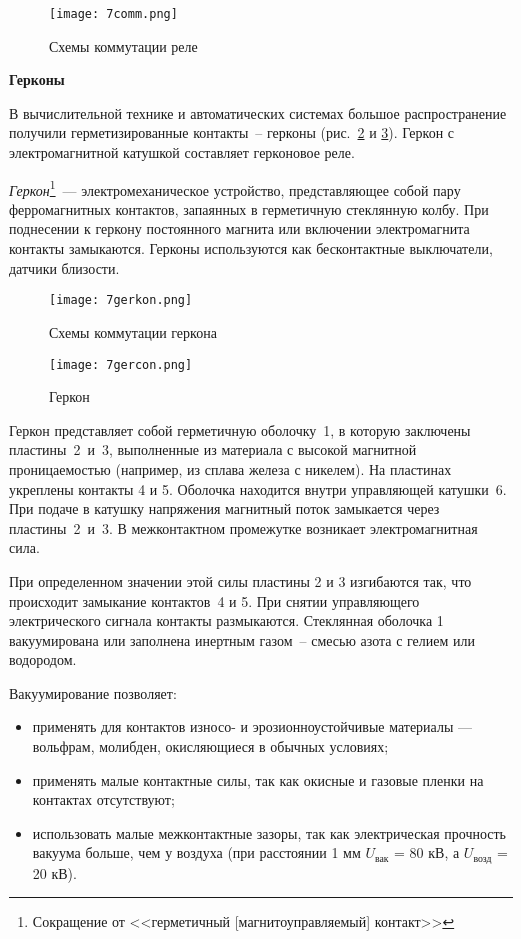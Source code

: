 \begin{figure}[h!]
	\caption{ Схемы коммутации реле }
	\texttt{[image: 7comm.png]}
	\label{pic:7comm}
\end{figure}

\begin{flushleft}
\textbf{Герконы }
\end{flushleft}

В вычислительной технике и автоматических системах большое распространение получили герметизированные контакты~-- герконы (рис.~\ref{pic:7gerkon} и \ref{pic:7gercon}). Геркон с электромагнитной катушкой составляет герконовое реле.

\textit{Геркон}\footnote{Сокращение от <<герметичный [магнитоуправляемый] контакт>>}~--- электромеханическое устройство, представляющее собой пару ферромагнитных контактов, запаянных в герметичную стеклянную колбу. При поднесении к геркону постоянного магнита или включении электромагнита контакты замыкаются. Герконы используются как бесконтактные выключатели, датчики близости.

\begin{figure}[h!]
	\caption{ Схемы коммутации геркона }
	\texttt{[image: 7gerkon.png]}
	\label{pic:7gerkon}
\end{figure}

\begin{figure}[h!]
	\caption{ Геркон }
	\texttt{[image: 7gercon.png]}
	\label{pic:7gercon}
\end{figure}

Геркон представляет собой герметичную оболочку~1, в которую заключены пластины~2~и~3, выполненные из материала с высокой магнитной  проницаемостью (например, из сплава железа с никелем). На пластинах укреплены контакты 4 и 5. Оболочка находится внутри управляющей катушки~6. При подаче в катушку напряжения магнитный поток замыкается через пластины~2~и~3. В межконтактном промежутке возникает электромагнитная сила. 

При определенном значении этой силы пластины 2 и 3 изгибаются так, что происходит замыкание контактов~4 и 5. При снятии управляющего электрического сигнала контакты размыкаются. Стеклянная оболочка 1 вакуумирована или заполнена инертным газом~-- смесью азота с гелием или водородом. 

Вакуумирование позволяет:
\begin{itemize}
\item применять для контактов износо- и эрозионноустойчивые материалы --- вольфрам, молибден, окисляющиеся в обычных условиях;
\item применять малые контактные силы, так как окисные и газовые пленки на контактах отсутствуют; 
\item использовать малые межконтактные зазоры, так как электрическая прочность вакуума больше, чем у воздуха (при расстоянии 1 мм $ U_\text{вак} $ = 80 кВ, а $ U_\text{возд} $ = 20 кВ).
\end{itemize}

